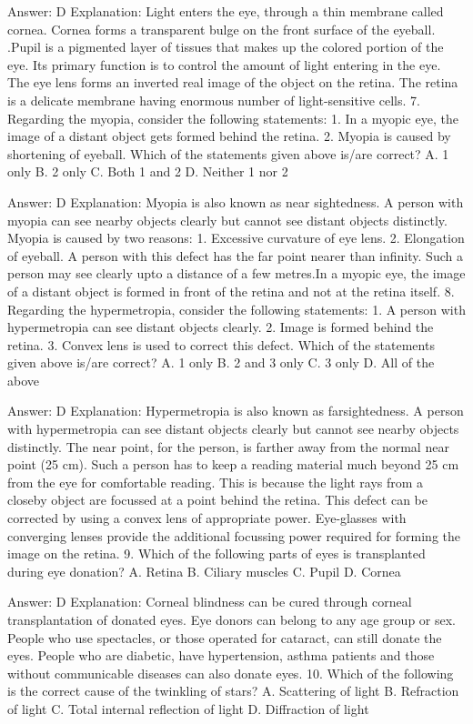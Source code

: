 Answer: D
Explanation: Light enters the eye, through a thin membrane called cornea. Cornea forms a transparent bulge on the front surface of the eyeball. .Pupil is a pigmented layer of tissues that makes up the colored portion of the eye. Its primary function is to control the amount of light entering in the eye. The eye lens forms an inverted real image of the object on the retina. The retina is a delicate membrane having enormous number of light-sensitive cells. 7. Regarding the myopia, consider the following statements: 1. In a myopic eye, the image of a distant object gets formed behind the retina. 2. Myopia is caused by shortening of eyeball. Which of the statements given above is/are correct? A. 1 only B. 2 only C. Both 1 and 2 D. Neither 1 nor 2 

Answer: D
Explanation: Myopia is also known as near sightedness. A person with myopia can see nearby objects clearly but cannot see distant objects distinctly. Myopia is caused by two reasons: 1. Excessive curvature of eye lens. 2. Elongation of eyeball. A person with this defect has the far point nearer than infinity. Such a person may see clearly upto a distance of a few metres.In a myopic eye, the image of a distant object is formed in front of the retina and not at the retina itself. 8. Regarding the hypermetropia, consider the following statements: 1. A person with hypermetropia can see distant objects clearly. 2. Image is formed behind the retina. 3. Convex lens is used to correct this defect. Which of the statements given above is/are correct? A. 1 only B. 2 and 3 only C. 3 only D. All of the above 

Answer: D
Explanation: Hypermetropia is also known as farsightedness. A person with hypermetropia can see distant objects clearly but cannot see nearby objects distinctly. The near point, for the person, is farther away from the normal near point (25 cm). Such a person has to keep a reading material much beyond 25 cm from the eye for comfortable reading. This is because the light rays from a closeby object are focussed at a point behind the retina. This defect can be corrected by using a convex lens of appropriate power. Eye-glasses with converging lenses provide the additional focussing power required for forming the image on the retina. 9. Which of the following parts of eyes is transplanted during eye donation? A. Retina B. Ciliary muscles C. Pupil D. Cornea 

Answer: D
Explanation: Corneal blindness can be cured through corneal transplantation of donated eyes. Eye donors can belong to any age group or sex. People who use spectacles, or those operated for cataract, can still donate the eyes. People who are diabetic, have hypertension, asthma patients and those without communicable diseases can also donate eyes. 10. Which of the following is the correct cause of the twinkling of stars? A. Scattering of light B. Refraction of light C. Total internal reflection of light D. Diffraction of light 

